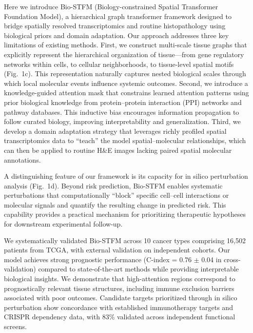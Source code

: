 \documentclass[pdflatex,sn-nature]{sn-jnl}%
\theoremstyle{thmstyleone}%
\theoremstyle{thmstyletwo}%
\theoremstyle{thmstylethree}%
\begin{document}
Here we introduce Bio-STFM (Biology-constrained Spatial Transformer Foundation Model), a hierarchical graph transformer framework designed to bridge spatially resolved transcriptomics and routine histopathology using biological priors and domain adaptation. Our approach addresses three key limitations of existing methods. First, we construct multi-scale tissue graphs that explicitly represent the hierarchical organization of tissue---from gene regulatory networks within cells, to cellular neighborhoods, to tissue-level spatial motifs (Fig.~1c). This representation naturally captures nested biological scales through which local molecular events influence systemic outcomes\cite{bib13,bib51}. Second, we introduce a knowledge-guided attention mask that constrains learned attention patterns using prior biological knowledge from protein--protein interaction (PPI) networks and pathway databases\cite{bib14,bib34}. This inductive bias encourages information propagation to follow curated biology, improving interpretability and generalization. Third, we develop a domain adaptation strategy\cite{bib73} that leverages richly profiled spatial transcriptomics data to ``teach'' the model spatial--molecular relationships, which can then be applied to routine H\&E images lacking paired spatial molecular annotations.

A distinguishing feature of our framework is its capacity for in silico perturbation analysis (Fig.~1d). Beyond risk prediction, Bio-STFM enables systematic perturbations that computationally ``block'' specific cell--cell interactions or molecular signals and quantify the resulting change in predicted risk\cite{bib66}. This capability provides a practical mechanism for prioritizing therapeutic hypotheses for downstream experimental follow-up\cite{bib64}.

We systematically validated Bio-STFM across 10 cancer types comprising 16,502 patients from TCGA\cite{bib10,bib11}, with external validation on independent cohorts. Our model achieves strong prognostic performance (C-index = 0.76 $\pm$ 0.04 in cross-validation) compared to state-of-the-art methods while providing interpretable biological insights\cite{bib62}. We demonstrate that high-attention regions correspond to prognostically relevant tissue structures, including immune exclusion barriers associated with poor outcomes\cite{bib70}. Candidate targets prioritized through in silico perturbation show concordance with established immunotherapy targets\cite{bib20,bib54} and CRISPR dependency data, with 83\% validated across independent functional screens.
\end{document}
